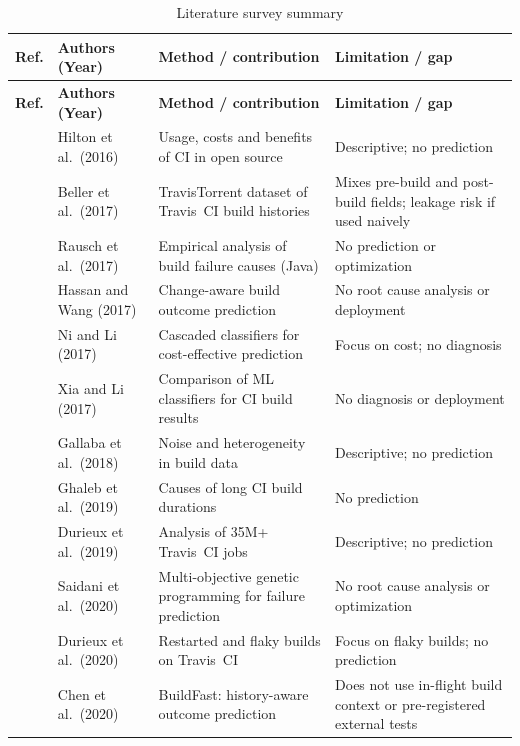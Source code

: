 \begin{longtable}{|>{\centering\arraybackslash}p{0.7cm}|p{2.9cm}|p{5.6cm}|p{5.0cm}|}
\caption{Literature survey summary}\label{tab:lit}\\
\hline
\textbf{Ref.} & \textbf{Authors (Year)} & \textbf{Method / contribution} & \textbf{Limitation / gap}\\ \hline
\endfirsthead
\hline
\textbf{Ref.} & \textbf{Authors (Year)} & \textbf{Method / contribution} & \textbf{Limitation / gap}\\ \hline
\endhead
\cite{hilton2016usage} & Hilton et al.\ (2016) & Usage, costs and benefits of CI in open source & Descriptive; no prediction\\ \hline
\cite{beller2017travistorrent} & Beller et al.\ (2017) & TravisTorrent dataset of Travis~CI build histories & Mixes pre-build and post-build fields; leakage risk if used naively\\ \hline
\cite{rausch2017empirical} & Rausch et al.\ (2017) & Empirical analysis of build failure causes (Java) & No prediction or optimization\\ \hline
\cite{hassan2017change} & Hassan and Wang (2017) & Change-aware build outcome prediction & No root cause analysis or deployment\\ \hline
\cite{ni2017cost} & Ni and Li (2017) & Cascaded classifiers for cost-effective prediction & Focus on cost; no diagnosis\\ \hline
\cite{xia2017could} & Xia and Li (2017) & Comparison of ML classifiers for CI build results & No diagnosis or deployment\\ \hline
\cite{gallaba2018noise} & Gallaba et al.\ (2018) & Noise and heterogeneity in build data & Descriptive; no prediction\\ \hline
\cite{ghaleb2019empirical} & Ghaleb et al.\ (2019) & Causes of long CI build durations & No prediction\\ \hline
\cite{durieux2019analysis} & Durieux et al.\ (2019) & Analysis of 35M+ Travis~CI jobs & Descriptive; no prediction\\ \hline
\cite{saidani2020predicting} & Saidani et al.\ (2020) & Multi-objective genetic programming for failure prediction & No root cause analysis or optimization\\ \hline
\cite{durieux2020empirical} & Durieux et al.\ (2020) & Restarted and flaky builds on Travis~CI & Focus on flaky builds; no prediction\\ \hline
\cite{chen2020buildfast} & Chen et al.\ (2020) & BuildFast: history-aware outcome prediction & Does not use in-flight build context or pre-registered external tests\\ \hline

\end{longtable}
